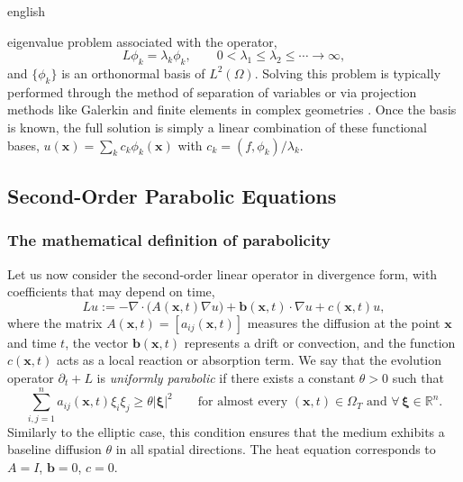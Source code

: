 \documentclass[12pt,letterpaper,twoside]{book}
\newcommand{\abs}[1]{\left\lvert #1 \right\rvert}
\begin{document}
\begin{hyphenrules}{english}
\begin{enumerate}
    eigenvalue problem associated with the operator,
    \begin{equation}
      L\phi_k=\lambda_k\phi_k,\qquad 0<\lambda_1\le\lambda_2\le\cdots\to\infty,
      \label{eq:eigen}
    \end{equation}
    and $\{\phi_k\}$ is an orthonormal basis of $L^2(\Omega)$. Solving this problem is typically
    performed through the method of separation of variables \cite{evans2010} or via projection
    methods like Galerkin and finite elements in complex geometries \cite{zienkiewicz2013}. Once
    the basis is known, the full solution is simply a linear combination of these functional bases,
    $u(\mathbf{x})=\sum_k c_k\phi_k(\mathbf{x})$ with $c_k=(f,\phi_k)/\lambda_k$.
\end{enumerate}

\subsection{Second-Order Parabolic Equations}\label{subsec:parabolic}

\subsubsection{The mathematical definition of parabolicity}
Let us now consider the second-order linear operator in divergence form, with coefficients that may
depend on time,
\begin{equation}
  Lu:=-\nabla\cdot\big(A(\mathbf{x},t)\nabla u\big)+\mathbf{b}(\mathbf{x},t)\cdot\nabla u+c(\mathbf{x},t)u,
  \label{eq:parabolic-op}
\end{equation}
where the matrix $A(\mathbf{x},t)=[a_{ij}(\mathbf{x},t)]$ measures the diffusion at the point $\mathbf{x}$ and time $t$, the
vector $\mathbf{b}(\mathbf{x},t)$ represents a drift or convection, and the function $c(\mathbf{x},t)$ acts as a local reaction
or absorption term. We say that the evolution operator $\partial_t+L$ is \emph{uniformly parabolic} if
there exists a constant $\theta>0$ such that
\begin{equation}
  \sum_{i,j=1}^{n}a_{ij}(\mathbf{x},t)\xi_i\xi_j\ge\theta\abs{\bm\xi}^2\qquad
  \text{for almost every }(\mathbf{x},t)\in\Omega_T\text{ and }\forall\,\bm\xi\in\mathbb{R}^n.
  \label{eq:uniform-parabolicity}
\end{equation}
Similarly to the elliptic case, this condition ensures that the medium exhibits a baseline diffusion
$\theta$ in all spatial directions. The heat equation corresponds to $A=I$, $\mathbf{b}=0$, $c=0$.


\end{hyphenrules}
\end{document}
